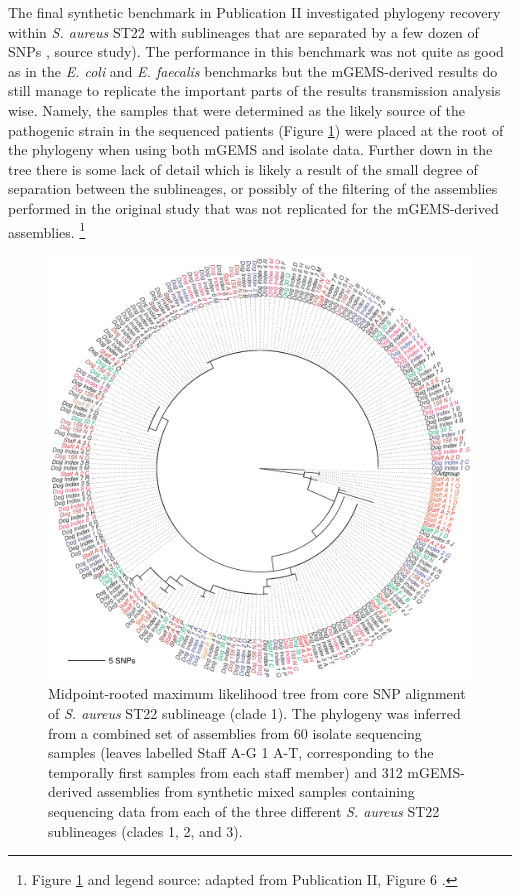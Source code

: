 \documentclass[officiallayout]{tktla}
\let\svthefootnote\thefootnote
\begin{document}
\pagebreak
The final synthetic benchmark in Publication II investigated
phylogeny recovery within \textit{S. aureus} ST22 with sublineages
that are separated by a few dozen of SNPs \citep{paterson2015capturing}, source
study). The performance in this benchmark was not quite as good as in
the \textit{E. coli} and \textit{E. faecalis} benchmarks but the
mGEMS-derived results do still manage to replicate the important parts
of the results transmission analysis wise. Namely, the samples that
were determined as the likely source of the pathogenic strain in the
sequenced patients (Figure \ref{fig:mgems-saureus-phylogeny}) were placed
at the root of the phylogeny when using both mGEMS and isolate
data. Further down in the tree there is some lack of detail which is
likely a result of the small degree of separation between the
sublineages, or possibly of the filtering of the assemblies performed
in the original study that was not replicated for the mGEMS-derived
assemblies.
\noindent\let\thefootnote\relax\footnote{Figure \ref{fig:mgems-saureus-phylogeny} and legend source: adapted from Publication II, Figure 6 \citep{maklin_bacterial_2021}.}
\addtocounter{footnote}{-1}\let\thefootnote\svthefootnote
\begin{figure}[!t]
  \centering
  \includegraphics[height=0.75\textheight,width=\textwidth,keepaspectratio]{img/reproduced/MGen2021_mGEMS_Figure_6.pdf}
  \caption{Midpoint-rooted maximum likelihood tree from core SNP
    alignment of \textit{S. aureus} ST22 sublineage (clade 1). The
    phylogeny was inferred from a combined set of assemblies from 60
    isolate sequencing samples (leaves labelled Staff A-G 1 A-T,
    corresponding to the temporally first samples from each staff
    member) and 312 mGEMS-derived assemblies from synthetic mixed
    samples containing sequencing data from each of the three
    different \textit{S. aureus} ST22 sublineages (clades 1, 2, and 3).}
    \label{fig:mgems-saureus-phylogeny}
\end{figure}
\end{document}
